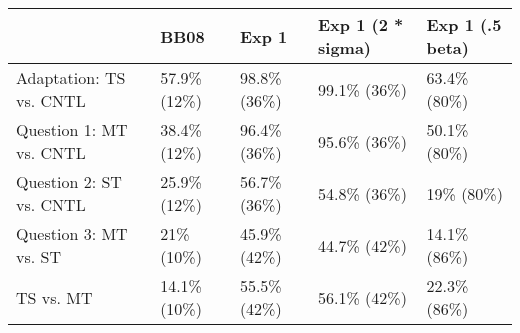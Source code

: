 
\begin{tabular}{l|l|l|l|l}
\hline
  & BB08 & Exp 1 & Exp 1 (2 * sigma) & Exp 1 (.5 beta)\\
\hline
Adaptation: TS vs. CNTL & 57.9\% (12\%) & 98.8\% (36\%) & 99.1\% (36\%) & 63.4\% (80\%)\\
\hline
Question 1: MT vs. CNTL & 38.4\% (12\%) & 96.4\% (36\%) & 95.6\% (36\%) & 50.1\% (80\%)\\
\hline
Question 2: ST vs. CNTL & 25.9\% (12\%) & 56.7\% (36\%) & 54.8\% (36\%) & 19\% (80\%)\\
\hline
Question 3: MT vs. ST & 21\% (10\%) & 45.9\% (42\%) & 44.7\% (42\%) & 14.1\% (86\%)\\
\hline
TS vs. MT & 14.1\% (10\%) & 55.5\% (42\%) & 56.1\% (42\%) & 22.3\% (86\%)\\
\hline
\end{tabular}
